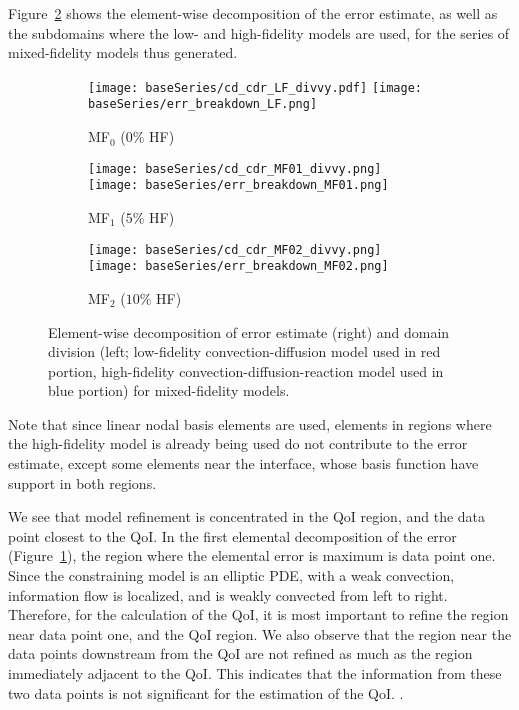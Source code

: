 Figure~\ref{fig:baseRef} shows the element-wise decomposition of the error estimate, as well as the subdomains where the low- and high-fidelity models are used, for the series of mixed-fidelity models thus generated.
%
\begin{figure}[h!]
\centering
  \begin{subfigure}[b]{\textwidth}
  \centering    
    \texttt{[image: baseSeries/cd\_cdr\_LF\_divvy.pdf]}
    \texttt{[image: baseSeries/err\_breakdown\_LF.png]}
    \vspace{-0.5\baselineskip}
    \caption{MF$_0$ ($0\%$ HF)}
    \label{fig:baseRef0}
    \vspace{0.8\baselineskip}
  \end{subfigure}
	\begin{subfigure}[b]{\textwidth}
  \centering
    \texttt{[image: baseSeries/cd\_cdr\_MF01\_divvy.png]}
    \texttt{[image: baseSeries/err\_breakdown\_MF01.png]}
    \vspace{-0.5\baselineskip}
    \caption{MF$_1$ ($5\%$ HF)}
    \vspace{0.8\baselineskip}
  \end{subfigure}
  \begin{subfigure}[b]{\textwidth}
  \centering
    \texttt{[image: baseSeries/cd\_cdr\_MF02\_divvy.png]}
    \texttt{[image: baseSeries/err\_breakdown\_MF02.png]}
    \vspace{-0.5\baselineskip}
    \caption{MF$_2$ ($10\%$ HF)}
    \vspace{0.8\baselineskip}
  \end{subfigure}
\caption{Element-wise decomposition of error estimate (right) and domain division (left; low-fidelity convection-diffusion model used in red portion, high-fidelity convection-diffusion-reaction model used in blue portion) for mixed-fidelity models.}
\label{fig:baseRef}
\end{figure}
%
Note that since linear nodal basis elements are used, elements in regions where the high-fidelity model is already being used do not contribute to the error estimate, except some elements near the interface, whose basis function have support in both regions.

We see that model refinement is concentrated in the QoI region, and the data point closest to the QoI. In the first elemental decomposition of the error (Figure~\ref{fig:baseRef0}), the region where the elemental error is maximum is data point one. Since the constraining model is an elliptic PDE, with a weak convection, information flow is localized, and is weakly convected from left to right. Therefore, for the calculation of the QoI, it is most important to refine the region near data point one, and the QoI region. 
We also observe that the region near the data points downstream from the QoI are not refined as much as the region immediately adjacent to the QoI. This indicates that the information from these two data points is not significant for the estimation of the QoI. . 

